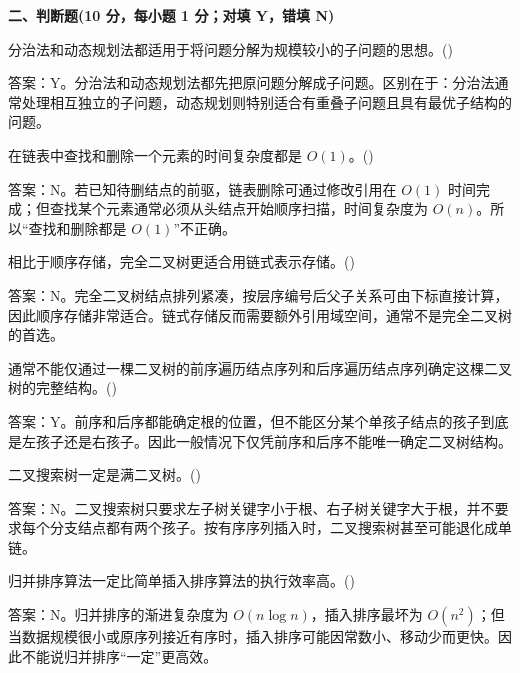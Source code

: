\textbf{二、判断题(10 分，每小题 1 分；对填 Y，错填 N)}

\begin{question}
分治法和动态规划法都适用于将问题分解为规模较小的子问题的思想。(\quad)
\begin{solution}
答案：Y。分治法和动态规划法都先把原问题分解成子问题。区别在于：分治法通常处理相互独立的子问题，动态规划则特别适合有重叠子问题且具有最优子结构的问题。
\end{solution}
\end{question}

\begin{question}
在链表中查找和删除一个元素的时间复杂度都是 $O(1)$。(\quad)
\begin{solution}
答案：N。若已知待删结点的前驱，链表删除可通过修改引用在 $O(1)$ 时间完成；但查找某个元素通常必须从头结点开始顺序扫描，时间复杂度为 $O(n)$。所以“查找和删除都是 $O(1)$”不正确。
\end{solution}
\end{question}

\begin{question}
相比于顺序存储，完全二叉树更适合用链式表示存储。(\quad)
\begin{solution}
答案：N。完全二叉树结点排列紧凑，按层序编号后父子关系可由下标直接计算，因此顺序存储非常适合。链式存储反而需要额外引用域空间，通常不是完全二叉树的首选。
\end{solution}
\end{question}

\begin{question}
通常不能仅通过一棵二叉树的前序遍历结点序列和后序遍历结点序列确定这棵二叉树的完整结构。(\quad)
\begin{solution}
答案：Y。前序和后序都能确定根的位置，但不能区分某个单孩子结点的孩子到底是左孩子还是右孩子。因此一般情况下仅凭前序和后序不能唯一确定二叉树结构。
\end{solution}
\end{question}

\begin{question}
二叉搜索树一定是满二叉树。(\quad)
\begin{solution}
答案：N。二叉搜索树只要求左子树关键字小于根、右子树关键字大于根，并不要求每个分支结点都有两个孩子。按有序序列插入时，二叉搜索树甚至可能退化成单链。
\end{solution}
\end{question}

\begin{question}
归并排序算法一定比简单插入排序算法的执行效率高。(\quad)
\begin{solution}
答案：N。归并排序的渐进复杂度为 $O(n\log n)$，插入排序最坏为 $O(n^2)$；但当数据规模很小或原序列接近有序时，插入排序可能因常数小、移动少而更快。因此不能说归并排序“一定”更高效。
\end{solution}
\end{question}

